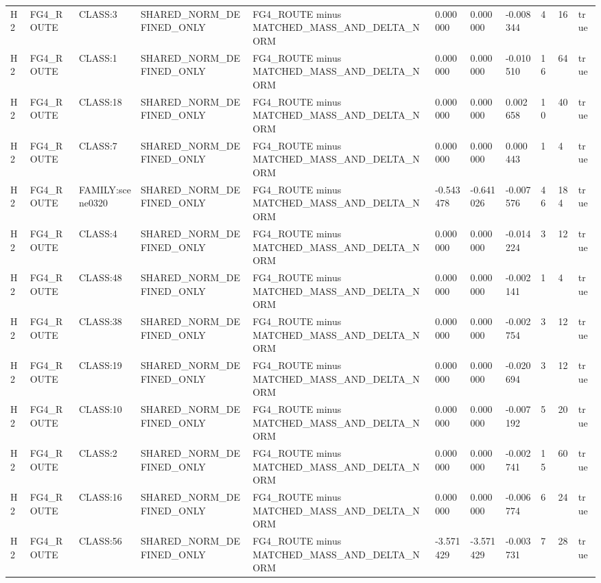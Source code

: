 \begin{tabular}{lllllllllll}
H2 & FG4\_ROUTE & CLASS:3 & SHARED\_NORM\_DEFINED\_ONLY & FG4\_ROUTE minus MATCHED\_MASS\_AND\_DELTA\_NORM & 0.000000 & 0.000000 & -0.008344 & 4 & 16 & true \\
H2 & FG4\_ROUTE & CLASS:1 & SHARED\_NORM\_DEFINED\_ONLY & FG4\_ROUTE minus MATCHED\_MASS\_AND\_DELTA\_NORM & 0.000000 & 0.000000 & -0.010510 & 16 & 64 & true \\
H2 & FG4\_ROUTE & CLASS:18 & SHARED\_NORM\_DEFINED\_ONLY & FG4\_ROUTE minus MATCHED\_MASS\_AND\_DELTA\_NORM & 0.000000 & 0.000000 & 0.002658 & 10 & 40 & true \\
H2 & FG4\_ROUTE & CLASS:7 & SHARED\_NORM\_DEFINED\_ONLY & FG4\_ROUTE minus MATCHED\_MASS\_AND\_DELTA\_NORM & 0.000000 & 0.000000 & 0.000443 & 1 & 4 & true \\
H2 & FG4\_ROUTE & FAMILY:scene0320 & SHARED\_NORM\_DEFINED\_ONLY & FG4\_ROUTE minus MATCHED\_MASS\_AND\_DELTA\_NORM & -0.543478 & -0.641026 & -0.007576 & 46 & 184 & true \\
H2 & FG4\_ROUTE & CLASS:4 & SHARED\_NORM\_DEFINED\_ONLY & FG4\_ROUTE minus MATCHED\_MASS\_AND\_DELTA\_NORM & 0.000000 & 0.000000 & -0.014224 & 3 & 12 & true \\
H2 & FG4\_ROUTE & CLASS:48 & SHARED\_NORM\_DEFINED\_ONLY & FG4\_ROUTE minus MATCHED\_MASS\_AND\_DELTA\_NORM & 0.000000 & 0.000000 & -0.002141 & 1 & 4 & true \\
H2 & FG4\_ROUTE & CLASS:38 & SHARED\_NORM\_DEFINED\_ONLY & FG4\_ROUTE minus MATCHED\_MASS\_AND\_DELTA\_NORM & 0.000000 & 0.000000 & -0.002754 & 3 & 12 & true \\
H2 & FG4\_ROUTE & CLASS:19 & SHARED\_NORM\_DEFINED\_ONLY & FG4\_ROUTE minus MATCHED\_MASS\_AND\_DELTA\_NORM & 0.000000 & 0.000000 & -0.020694 & 3 & 12 & true \\
H2 & FG4\_ROUTE & CLASS:10 & SHARED\_NORM\_DEFINED\_ONLY & FG4\_ROUTE minus MATCHED\_MASS\_AND\_DELTA\_NORM & 0.000000 & 0.000000 & -0.007192 & 5 & 20 & true \\
H2 & FG4\_ROUTE & CLASS:2 & SHARED\_NORM\_DEFINED\_ONLY & FG4\_ROUTE minus MATCHED\_MASS\_AND\_DELTA\_NORM & 0.000000 & 0.000000 & -0.002741 & 15 & 60 & true \\
H2 & FG4\_ROUTE & CLASS:16 & SHARED\_NORM\_DEFINED\_ONLY & FG4\_ROUTE minus MATCHED\_MASS\_AND\_DELTA\_NORM & 0.000000 & 0.000000 & -0.006774 & 6 & 24 & true \\
H2 & FG4\_ROUTE & CLASS:56 & SHARED\_NORM\_DEFINED\_ONLY & FG4\_ROUTE minus MATCHED\_MASS\_AND\_DELTA\_NORM & -3.571429 & -3.571429 & -0.003731 & 7 & 28 & true \\

\end{tabular}
